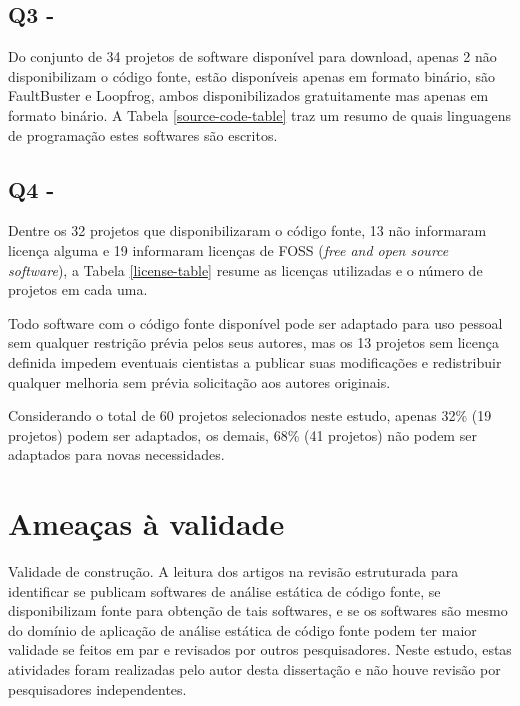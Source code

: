 \subsection{Q3 - \EstudoUmQuestaoTres} %

Do conjunto de 34 projetos de software disponível para download, apenas 2 não
disponibilizam o código fonte, estão disponíveis apenas em formato binário, são
FaultBuster e Loopfrog, ambos disponibilizados gratuitamente mas apenas em
formato binário. A Tabela \ref{source-code-table} traz um resumo de quais
linguagens de programação estes softwares são escritos.




\subsection{Q4 - \EstudoUmQuestaoQuatro} %

Dentre os 32 projetos que disponibilizaram o código fonte, 13 não informaram
licença alguma e 19 informaram licenças de FOSS ({\it free and open source
software}), a Tabela \ref{license-table} resume as licenças utilizadas e o
número de projetos em cada uma.



Todo software com o código fonte disponível pode ser adaptado para uso pessoal
sem qualquer restrição prévia pelos seus autores, mas os 13 projetos sem
licença definida impedem eventuais cientistas a publicar suas modificações e
redistribuir qualquer melhoria sem prévia solicitação aos autores originais.

Considerando o total de 60 projetos selecionados neste estudo, apenas 32\% (19
projetos) podem ser adaptados, os demais, 68\% (41 projetos) não podem ser
adaptados para novas necessidades.

\section{Ameaças à validade}

Validade de construção.
A leitura dos artigos na revisão estruturada para identificar se publicam
softwares de análise estática de código fonte, se disponibilizam fonte para
obtenção de tais softwares, e se os softwares são mesmo do domínio de aplicação
de análise estática de código fonte podem ter maior validade se feitos em
par e revisados por outros pesquisadores.
Neste estudo, estas atividades foram realizadas pelo autor desta dissertação e 
não houve revisão por pesquisadores independentes.


